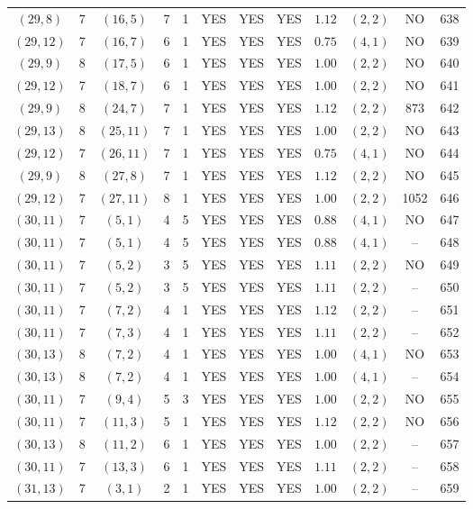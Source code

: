 \begin{longtable}{|c|c|c|c|c|c|c|c|c|c|c|c|}
$(29,8)$ & 7 & $(16,5)$ & 7 & 1 & YES & YES & YES & $1.12$ & $(2,2)$ & NO & 638\\
$(29,12)$ & 7 & $(16,7)$ & 6 & 1 & YES & YES & YES & $0.75$ & $(4,1)$ & NO & 639\\
$(29,9)$ & 8 & $(17,5)$ & 6 & 1 & YES & YES & YES & $1.00$ & $(2,2)$ & NO & 640\\
$(29,12)$ & 7 & $(18,7)$ & 6 & 1 & YES & YES & YES & $1.00$ & $(2,2)$ & NO & 641\\
$(29,9)$ & 8 & $(24,7)$ & 7 & 1 & YES & YES & YES & $1.12$ & $(2,2)$ & 873 & 642\\
$(29,13)$ & 8 & $(25,11)$ & 7 & 1 & YES & YES & YES & $1.00$ & $(2,2)$ & NO & 643\\
$(29,12)$ & 7 & $(26,11)$ & 7 & 1 & YES & YES & YES & $0.75$ & $(4,1)$ & NO & 644\\
$(29,9)$ & 8 & $(27,8)$ & 7 & 1 & YES & YES & YES & $1.12$ & $(2,2)$ & NO & 645\\
$(29,12)$ & 7 & $(27,11)$ & 8 & 1 & YES & YES & YES & $1.00$ & $(2,2)$ & 1052 & 646\\
$(30,11)$ & 7 & $(5,1)$ & 4 & 5 & YES & YES & YES & $0.88$ & $(4,1)$ & NO & 647\\
$(30,11)$ & 7 & $(5,1)$ & 4 & 5 & YES & YES & YES & $0.88$ & $(4,1)$ & -- & 648\\
$(30,11)$ & 7 & $(5,2)$ & 3 & 5 & YES & YES & YES & $1.11$ & $(2,2)$ & NO & 649\\
$(30,11)$ & 7 & $(5,2)$ & 3 & 5 & YES & YES & YES & $1.11$ & $(2,2)$ & -- & 650\\
$(30,11)$ & 7 & $(7,2)$ & 4 & 1 & YES & YES & YES & $1.12$ & $(2,2)$ & -- & 651\\
$(30,11)$ & 7 & $(7,3)$ & 4 & 1 & YES & YES & YES & $1.11$ & $(2,2)$ & -- & 652\\
$(30,13)$ & 8 & $(7,2)$ & 4 & 1 & YES & YES & YES & $1.00$ & $(4,1)$ & NO & 653\\
$(30,13)$ & 8 & $(7,2)$ & 4 & 1 & YES & YES & YES & $1.00$ & $(4,1)$ & -- & 654\\
$(30,11)$ & 7 & $(9,4)$ & 5 & 3 & YES & YES & YES & $1.00$ & $(2,2)$ & NO & 655\\
$(30,11)$ & 7 & $(11,3)$ & 5 & 1 & YES & YES & YES & $1.12$ & $(2,2)$ & NO & 656\\
$(30,13)$ & 8 & $(11,2)$ & 6 & 1 & YES & YES & YES & $1.00$ & $(2,2)$ & -- & 657\\
$(30,11)$ & 7 & $(13,3)$ & 6 & 1 & YES & YES & YES & $1.11$ & $(2,2)$ & -- & 658\\
$(31,13)$ & 7 & $(3,1)$ & 2 & 1 & YES & YES & YES & $1.00$ & $(2,2)$ & -- & 659\\

\end{longtable}
